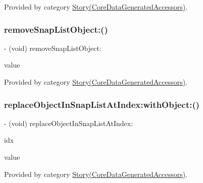 Provided by category \hyperlink{category_story_07_core_data_generated_accessors_08_a9c8c74f019b3ea3a94588064ea5fd7b6}{Story(\+Core\+Data\+Generated\+Accessors)}.

\hypertarget{interface_story_af05da85ccc12e572393216b85f297ce2}{}\label{interface_story_af05da85ccc12e572393216b85f297ce2} 
\subsubsection{\texorpdfstring{remove\+Snap\+List\+Object\+:()}{removeSnapListObject:()}}
{\footnotesize\ttfamily -\/ (void) remove\+Snap\+List\+Object\+: \begin{DoxyParamCaption}\item[{(\hyperlink{interface_snap}{Snap} $\ast$)}]{value }\end{DoxyParamCaption}}



Provided by category \hyperlink{category_story_07_core_data_generated_accessors_08_af05da85ccc12e572393216b85f297ce2}{Story(\+Core\+Data\+Generated\+Accessors)}.

\hypertarget{interface_story_a8e0f8bc62ff304aedad4d3cc99e9398d}{}\label{interface_story_a8e0f8bc62ff304aedad4d3cc99e9398d} 
\subsubsection{\texorpdfstring{replace\+Object\+In\+Snap\+List\+At\+Index\+:with\+Object\+:()}{replaceObjectInSnapListAtIndex:withObject:()}}
{\footnotesize\ttfamily -\/ (void) replace\+Object\+In\+Snap\+List\+At\+Index\+: \begin{DoxyParamCaption}\item[{(N\+S\+U\+Integer)}]{idx }\item[{withObject:(\hyperlink{interface_snap}{Snap} $\ast$)}]{value }\end{DoxyParamCaption}}



Provided by category \hyperlink{category_story_07_core_data_generated_accessors_08_a8e0f8bc62ff304aedad4d3cc99e9398d}{Story(\+Core\+Data\+Generated\+Accessors)}.


